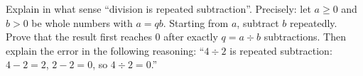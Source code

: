 Explain in what sense ``division is repeated subtraction''. Precisely: let $a\ge0$ and $b>0$ be whole numbers with $a=qb$. Starting from $a$, subtract $b$ repeatedly. Prove that the result first reaches $0$ after exactly $q=a\div b$ subtractions. Then explain the error in the following reasoning: ``$4\div2$ is repeated subtraction: $4-2=2$, $2-2=0$, so $4\div2=0$.''
